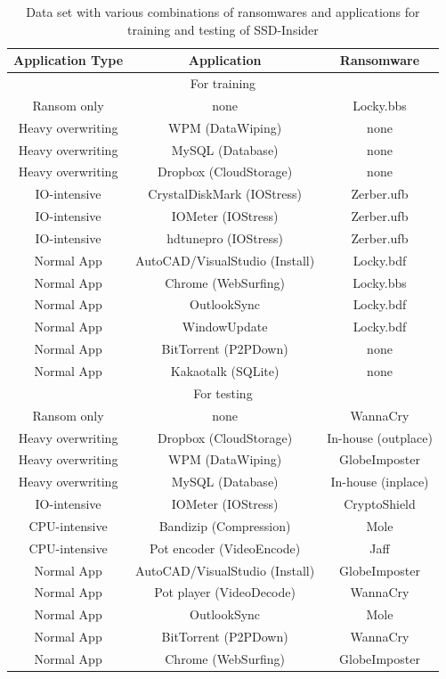 \documentclass[conference]{IEEEtran}
\newcommand{\ours}{SSD-Insider}
\begin{document}
\begin{table}[t]
	\centering
	\caption{Data set with various combinations of ransomwares and applications for training and testing of \ours{}}
	\begin{tabular}{c|c|c}
		\hline
		Application Type & Application & Ransomware \\
		\hline
		\hline 
		\multicolumn{3}{c}{For training}\\
		\hline 
		Ransom only & none & Locky.bbs \\
		Heavy overwriting& WPM (DataWiping) & none \\
		Heavy overwriting& MySQL (Database) & none \\
		Heavy overwriting& Dropbox (CloudStorage) & none \\
		IO-intensive& CrystalDiskMark (IOStress) & Zerber.ufb \\
		IO-intensive& IOMeter (IOStress) & Zerber.ufb \\
		IO-intensive& hdtunepro (IOStress) & Zerber.ufb \\
		Normal App& AutoCAD/VisualStudio (Install)& Locky.bdf\\
		Normal App& Chrome (WebSurfing) & Locky.bbs \\
		Normal App& OutlookSync & Locky.bdf \\
		Normal App& WindowUpdate & Locky.bdf \\
		Normal App& BitTorrent (P2PDown) & none \\
		Normal App& Kakaotalk (SQLite) & none \\
		\hline
		\multicolumn{3}{c}{For testing}\\
		\hline 
		Ransom only & none & WannaCry \\ 
		Heavy overwriting & Dropbox (CloudStorage) & In-house (outplace) \\
		Heavy overwriting & WPM (DataWiping) & GlobeImposter \\
		Heavy overwriting & MySQL (Database) & In-house (inplace) \\ 
		IO-intensive & IOMeter (IOStress) & CryptoShield \\ 
		CPU-intensive & Bandizip (Compression) & Mole \\ 
		CPU-intensive & Pot encoder (VideoEncode) & Jaff \\ 
		Normal App & AutoCAD/VisualStudio (Install) & GlobeImposter\\ 
		Normal App & Pot player (VideoDecode) & WannaCry \\ 
		Normal App & OutlookSync & Mole \\ 
		Normal App & BitTorrent (P2PDown) & WannaCry \\ 
		Normal App & Chrome (WebSurfing) & GlobeImposter \\ 
		\hline
	\end{tabular}
	\label{tab:benchmarks}
\end{table}
\end{document}

